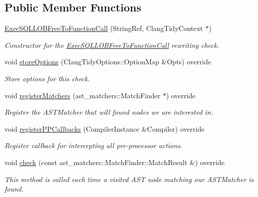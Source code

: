 \subsection*{Public Member Functions}
\begin{DoxyCompactItemize}
\item 
\hyperlink{classclang_1_1tidy_1_1pagesjaunes_1_1_exec_s_q_l_l_o_b_free_to_function_call_a191d57a9b724f7d5baa73b2a2ca30189}{Exec\+S\+Q\+L\+L\+O\+B\+Free\+To\+Function\+Call} (String\+Ref, Clang\+Tidy\+Context $\ast$)
\begin{DoxyCompactList}\small\item\em Constructor for the \hyperlink{classclang_1_1tidy_1_1pagesjaunes_1_1_exec_s_q_l_l_o_b_free_to_function_call}{Exec\+S\+Q\+L\+L\+O\+B\+Free\+To\+Function\+Call} rewriting check. \end{DoxyCompactList}\item 
void \hyperlink{classclang_1_1tidy_1_1pagesjaunes_1_1_exec_s_q_l_l_o_b_free_to_function_call_a6b661c169889e1165f82b4049b440439}{store\+Options} (Clang\+Tidy\+Options\+::\+Option\+Map \&Opts) override
\begin{DoxyCompactList}\small\item\em Store options for this check. \end{DoxyCompactList}\item 
void \hyperlink{classclang_1_1tidy_1_1pagesjaunes_1_1_exec_s_q_l_l_o_b_free_to_function_call_a0a7195298efb7ce3710d8708ba566cf3}{register\+Matchers} (ast\+\_\+matchers\+::\+Match\+Finder $\ast$) override
\begin{DoxyCompactList}\small\item\em Register the A\+S\+T\+Matcher that will found nodes we are interested in. \end{DoxyCompactList}\item 
void \hyperlink{classclang_1_1tidy_1_1pagesjaunes_1_1_exec_s_q_l_l_o_b_free_to_function_call_adfca3356f7ce579a0fb9c52edaba2fb8}{register\+P\+P\+Callbacks} (Compiler\+Instance \&Compiler) override
\begin{DoxyCompactList}\small\item\em Register callback for intercepting all pre-\/processor actions. \end{DoxyCompactList}\item 
void \hyperlink{classclang_1_1tidy_1_1pagesjaunes_1_1_exec_s_q_l_l_o_b_free_to_function_call_abf8924b6b17a361096fc755a9a637a97}{check} (const ast\+\_\+matchers\+::\+Match\+Finder\+::\+Match\+Result \&) override
\begin{DoxyCompactList}\small\item\em This method is called each time a visited A\+ST node matching our A\+S\+T\+Matcher is found. \end{DoxyCompactList}\end{DoxyCompactItemize}
